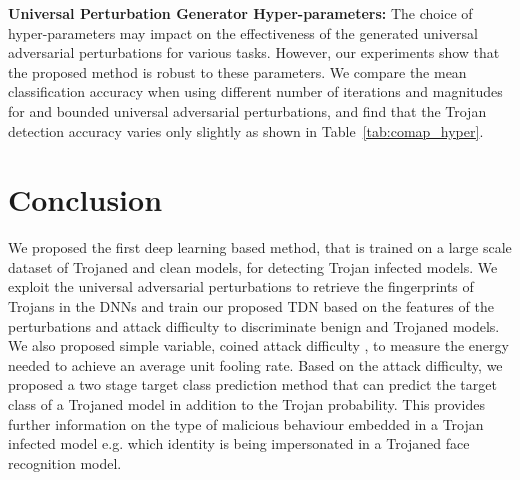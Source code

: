 \documentclass{article}
\begin{document}
{\bf  Universal Perturbation Generator Hyper-parameters:} The choice of hyper-parameters may impact on the effectiveness of the generated universal adversarial perturbations for various tasks. However, our experiments show that the proposed method is robust to these parameters. We compare the mean classification accuracy when using different number of iterations and magnitudes for  and  bounded universal adversarial perturbations, and find that the Trojan detection accuracy varies only slightly as shown in Table~\ref{tab:comap_hyper}. 



























\vspace{-3mm}
\section{Conclusion}
\vspace{-3mm}

We proposed the first deep learning based method, that is trained on a large scale dataset of Trojaned and clean models, for detecting Trojan infected models. 
We exploit the universal adversarial perturbations to retrieve the fingerprints of Trojans in the DNNs and train our proposed TDN based on the features of the perturbations and attack difficulty to discriminate benign and Trojaned models. We also proposed simple variable, coined attack difficulty , to measure the energy needed to achieve an average unit fooling rate. Based on the attack difficulty, we proposed a two stage target class prediction method that can predict the target class of a Trojaned model in addition to the Trojan probability. This provides further information on the type of malicious behaviour embedded in a Trojan infected model e.g. which identity is being impersonated in a Trojaned face recognition model.
\end{document}
